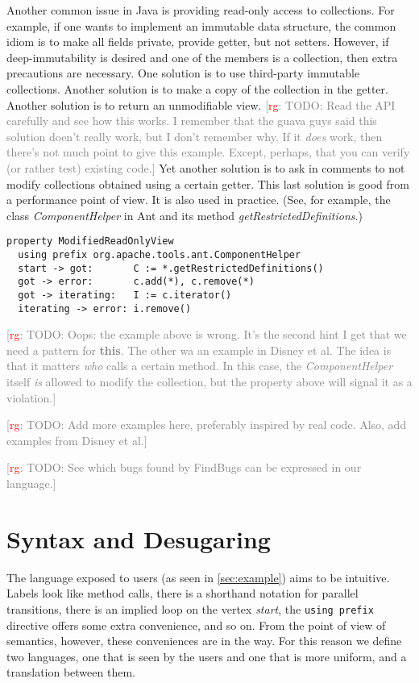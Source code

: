 \documentclass[preprint]{sigplanconf} %
\newcommand{\note}[2]{\textcolor{gray}{[\textcolor{red}{#1}: #2]}}
\newcommand{\rg}[1]{\note{rg}{#1}}
\theoremstyle{definition}
\begin{document}
Another common issue in Java is providing read-only access to collections.
For example, if one wants to implement an immutable data structure, the common idiom is to make all fields private, provide getter, but not setters.
However, if deep-immutability is desired and one of the members is a collection, then extra precautions are necessary.
One solution is to use third-party immutable collections.
Another solution is to make a copy of the collection in the getter.
Another solution is to return an unmodifiable view.
\rg{TODO: Read the API carefully and see how this works.
I remember that the guava guys said this solution doen't really work, but I don't remember why.
If it \emph{does} work, then there's not much point to give this example.
Except, perhaps, that you can verify (or rather test) existing code.}
Yet another solution is to ask in comments to not modify collections obtained using a certain getter.
This last solution is good from a performance point of view.
It is also used in practice.
(See, for example, the class \textit{ComponentHelper} in Ant and its method \textit{getRestrictedDefinitions}.)
\par\medskip\noindent
\begin{Verbatim}
property ModifiedReadOnlyView
  using prefix org.apache.tools.ant.ComponentHelper
  start -> got:       C := *.getRestrictedDefinitions()
  got -> error:       c.add(*), c.remove(*)
  got -> iterating:   I := c.iterator()
  iterating -> error: i.remove()
\end{Verbatim}
\par\medskip\noindent
\rg{TODO: Oops: the example above is wrong.
It's the second hint I get that we need a pattern for \textbf{this}.
The other wa an example in Disney et al.
The idea is that it matters \emph{who} calls a certain method.
In this case, the \textit{ComponentHelper} itself \emph{is} allowed to modify the collection, but the property above will signal it as a violation.}

\rg{TODO: Add more examples here, preferably inspired by real code.
Also, add examples from Disney et al.}

\rg{TODO: See which bugs found by FindBugs can be expressed in our language.}

\section{Syntax and Desugaring}\label{sec:syntax} %

The language exposed to users (as seen in \autoref{sec:example}) aims to be intuitive.
Labels look like method calls, there is a shorthand notation for parallel transitions, there is an implied loop on the vertex \textit{start}, the \texttt{using prefix} directive offers some extra convenience, and so on.
From the point of view of semantics, however, these conveniences are in the way.
For this reason we define two languages, one that is seen by the users and one that is more uniform, and a translation between them.
\end{document}

